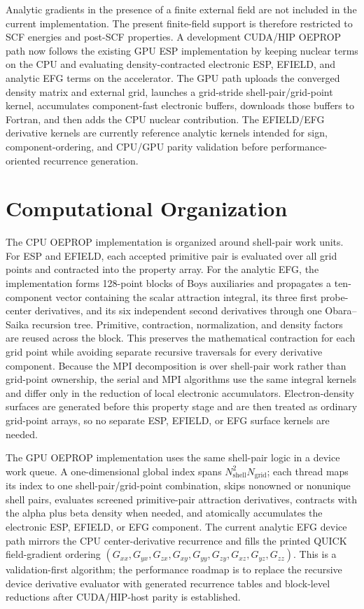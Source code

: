 \documentclass[journal=jcisd8,manuscript=article]{achemso}
\begin{document}
Analytic gradients in the presence of a finite external field are not included in the current implementation.  The present finite-field support is therefore restricted to SCF energies and post-SCF properties.  A development CUDA/HIP OEPROP path now follows the existing GPU ESP implementation by keeping nuclear terms on the CPU and evaluating density-contracted electronic ESP, EFIELD, and analytic EFG terms on the accelerator.  The GPU path uploads the converged density matrix and external grid, launches a grid-stride shell-pair/grid-point kernel, accumulates component-fast electronic buffers, downloads those buffers to Fortran, and then adds the CPU nuclear contribution.  The EFIELD/EFG derivative kernels are currently reference analytic kernels intended for sign, component-ordering, and CPU/GPU parity validation before performance-oriented recurrence generation.

\section{Computational Organization}

The CPU OEPROP implementation is organized around shell-pair work units.  For ESP and EFIELD, each accepted primitive pair is evaluated over all grid points and contracted into the property array.  For the analytic EFG, the implementation forms 128-point blocks of Boys auxiliaries and propagates a ten-component vector containing the scalar attraction integral, its three first probe-center derivatives, and its six independent second derivatives through one Obara--Saika recursion tree.  Primitive, contraction, normalization, and density factors are reused across the block.  This preserves the mathematical contraction for each grid point while avoiding separate recursive traversals for every derivative component.  Because the MPI decomposition is over shell-pair work rather than grid-point ownership, the serial and MPI algorithms use the same integral kernels and differ only in the reduction of local electronic accumulators.  Electron-density surfaces are generated before this property stage and are then treated as ordinary grid-point arrays, so no separate ESP, EFIELD, or EFG surface kernels are needed.

The GPU OEPROP implementation uses the same shell-pair logic in a device work queue.  A one-dimensional global index spans \(N_{\mathrm{shell}}^2N_{\mathrm{grid}}\); each thread maps its index to one shell-pair/grid-point combination, skips nonowned or nonunique shell pairs, evaluates screened primitive-pair attraction derivatives, contracts with the alpha plus beta density when needed, and atomically accumulates the electronic ESP, EFIELD, or EFG component.  The current analytic EFG device path mirrors the CPU center-derivative recurrence and fills the printed QUICK field-gradient ordering \((G_{xx},G_{yx},G_{zx},G_{xy},G_{yy},G_{zy},G_{xz},G_{yz},G_{zz})\).  This is a validation-first algorithm; the performance roadmap is to replace the recursive device derivative evaluator with generated recurrence tables and block-level reductions after CUDA/HIP-host parity is established.
\end{document}
